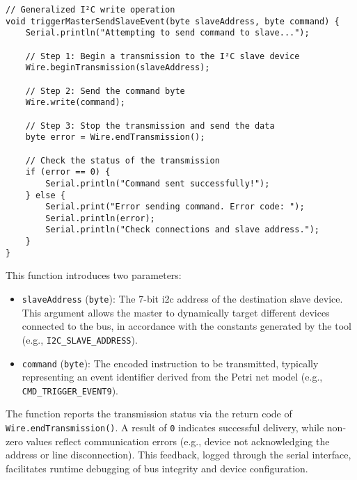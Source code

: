 \begin{verbatim}
// Generalized I²C write operation
void triggerMasterSendSlaveEvent(byte slaveAddress, byte command) {
    Serial.println("Attempting to send command to slave...");

    // Step 1: Begin a transmission to the I²C slave device
    Wire.beginTransmission(slaveAddress);

    // Step 2: Send the command byte
    Wire.write(command);

    // Step 3: Stop the transmission and send the data
    byte error = Wire.endTransmission();

    // Check the status of the transmission
    if (error == 0) {
        Serial.println("Command sent successfully!");
    } else {
        Serial.print("Error sending command. Error code: ");
        Serial.println(error);
        Serial.println("Check connections and slave address.");
    }
}
\end{verbatim}

\noindent
This function introduces two parameters:
\begin{itemize}
    \item \texttt{slaveAddress} (\texttt{byte}): The 7-bit \gls{i2c} address of the destination slave device. This argument allows the master to dynamically target different devices connected to the bus, in accordance with the constants generated by the tool (e.g., \texttt{I2C\_SLAVE\_ADDRESS}).
    \item \texttt{command} (\texttt{byte}): The encoded instruction to be transmitted, typically representing an event identifier derived from the Petri net model (e.g., \texttt{CMD\_TRIGGER\_EVENT9}).
\end{itemize}

The function reports the transmission status via the return code of \texttt{Wire.endTransmission()}. A result of \texttt{0} indicates successful delivery, while non-zero values reflect communication errors (e.g., device not acknowledging the address or line disconnection). This feedback, logged through the serial interface, facilitates runtime debugging of bus integrity and device configuration.

